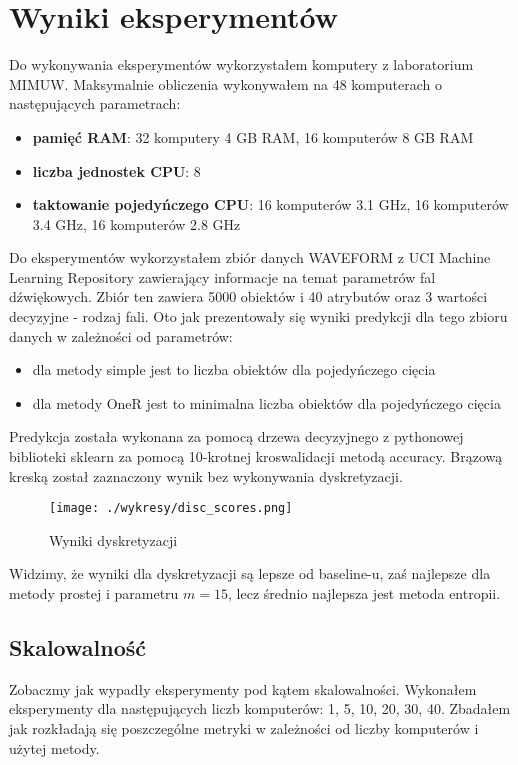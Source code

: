 \documentclass[magisterska]{pracamgr}
\theoremstyle{plain}
\theoremstyle{definition}
\theoremstyle{remark}
\begin{document}
\section{Wyniki eksperymentów}
Do wykonywania eksperymentów wykorzystałem komputery z laboratorium MIMUW. Maksymalnie obliczenia wykonywałem 
na 48 komputerach o następujących parametrach:
  \begin{itemize}
   \item \textbf{pamięć RAM}: 32 komputery 4 GB RAM, 16 komputerów 8 GB RAM
   \item \textbf{liczba jednostek CPU}: 8
   \item \textbf{taktowanie pojedyńczego CPU}: 16 komputerów 3.1 GHz, 16 komputerów 3.4 GHz, 16 komputerów 2.8 GHz
  \end{itemize}
Do eksperymentów wykorzystałem zbiór danych WAVEFORM z UCI Machine Learning Repository 
zawierający informacje na temat parametrów fal dźwiękowych.
Zbiór ten zawiera 5000 obiektów i 40 atrybutów oraz 3 wartości decyzyjne - rodzaj fali.
Oto jak prezentowały się wyniki predykcji dla tego zbioru danych w zależności od parametrów:
  \begin{itemize}
   \item dla metody simple jest to liczba obiektów dla pojedyńczego cięcia
   \item dla metody OneR jest to minimalna liczba obiektów dla pojedyńczego cięcia
  \end{itemize}

Predykcja została wykonana za pomocą drzewa decyzyjnego z pythonowej biblioteki sklearn za pomocą 10-krotnej
kroswalidacji metodą accuracy. Brązową kreską został zaznaczony wynik bez wykonywania dyskretyzacji.

\begin{figure}
 \caption{Wyniki dyskretyzacji}
 \centering\texttt{[image: ./wykresy/disc\_scores.png]}
\end{figure}

\newpage
Widzimy, że wyniki dla dyskretyzacji są lepsze od baseline-u, zaś najlepsze dla metody prostej i parametru $m = 15$, lecz 
średnio najlepsza jest metoda entropii.
\subsection{Skalowalność}
Zobaczmy jak wypadły eksperymenty pod kątem skalowalności. Wykonałem eksperymenty dla następujących liczb komputerów: 1, 5, 10, 20, 30, 40.
Zbadałem jak rozkładają się poszczególne metryki w zależności od liczby komputerów i użytej metody.
\end{document}

